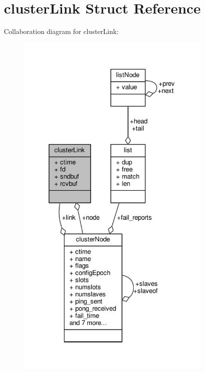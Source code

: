 \hypertarget{structclusterLink}{}\section{cluster\+Link Struct Reference}
\label{structclusterLink}


Collaboration diagram for cluster\+Link\+:\nopagebreak
\begin{figure}[H]
\begin{center}
\leavevmode
\includegraphics[width=275pt]{structclusterLink__coll__graph}
\end{center}
\end{figure}
